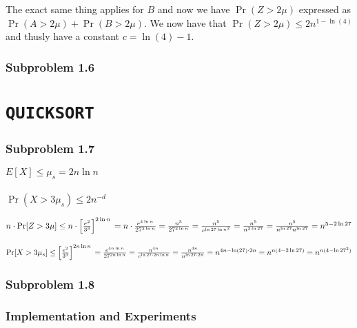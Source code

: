 \documentclass[article,a4paper,oneside]{memoir}
\newcommand{\+}[1]{\ensuremath{\boldsymbol{#1}}}
\begin{document}
The exact same thing applies for $B$ and now we have $\Pr ( Z > 2\mu)$ expressed as $\Pr ( A > 2\mu) + \Pr( B > 2\mu)$. We now have that $\Pr ( Z > 2\mu) \leq 2n^{1-\ln(4)}$ and thusly have a constant $c=\ln(4)-1$.


\subsection{Subproblem 1.6}


\chapter{\texttt{QUICKSORT}}

\subsection{Subproblem 1.7}
$E[X] \leq \mu_s = 2n\ln n$
\\\\
$\Pr (X > 3\mu_s) \leq 2n^{-d}$

$n\cdot \Pr[Z>3\mu]\leq n\cdot \left [ \frac{e^2}{3^3} \right ]^{2\ln n}\\
=n\cdot\frac{e^{4\ln n}}{27^{2\ln n}}\\
=\frac{n^5}{27^{2\ln n}}\\
=\frac{n^5}{e^{\ln 27 \ln n^2}}\\
=\frac{n^5}{n^{2\ln 27}}\\
=\frac{n^5}{n^{\ln 27}n^{\ln 27}}\\
=n^{5-2\ln 27}$


$\Pr[X>3\mu_s]\leq \left [ \frac{e^2}{3^3} \right ]^{2n\ln n}\\
=\frac{e^{4n\ln n}}{27^{2n\ln n}}\\
=\frac{n^{4n}}{e^{\ln 27\cdot 2n\ln n}}\\
=\frac{n^{4n}}{n^{\ln 27\cdot 2n}}\\
=n^{4n-\ln(27)\cdot 2n}\\
=n^{n(4-2\ln 27)}\\
=n^{n(4-\ln 27^2)}$
\subsection{Subproblem 1.8}

\subsection{Implementation and Experiments}
\end{document}
